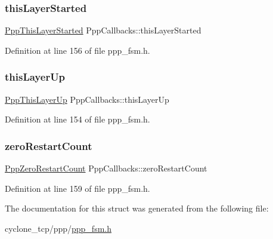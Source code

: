 \mbox{\label{structPppCallbacks_ade673782b1b8570a6edd46cbb5338ae2}} 
\subsubsection{\texorpdfstring{this\+Layer\+Started}{thisLayerStarted}}
{\footnotesize\ttfamily \hyperlink{ppp__fsm_8h_ac7f910cb18b43d86c18b79f95fd302a1}{Ppp\+This\+Layer\+Started} Ppp\+Callbacks\+::this\+Layer\+Started}



Definition at line 156 of file ppp\+\_\+fsm.\+h.

\mbox{\label{structPppCallbacks_ab370c1403e9b8a362747e6ea4e702b2f}} 
\subsubsection{\texorpdfstring{this\+Layer\+Up}{thisLayerUp}}
{\footnotesize\ttfamily \hyperlink{ppp__fsm_8h_af2c33e781717f7eeccba3b5ebac0524c}{Ppp\+This\+Layer\+Up} Ppp\+Callbacks\+::this\+Layer\+Up}



Definition at line 154 of file ppp\+\_\+fsm.\+h.

\mbox{\label{structPppCallbacks_a1a15264a659c18750ed7ca41dc893e04}} 
\subsubsection{\texorpdfstring{zero\+Restart\+Count}{zeroRestartCount}}
{\footnotesize\ttfamily \hyperlink{ppp__fsm_8h_a64f6f78275b72385feff6b734cb3523c}{Ppp\+Zero\+Restart\+Count} Ppp\+Callbacks\+::zero\+Restart\+Count}



Definition at line 159 of file ppp\+\_\+fsm.\+h.



The documentation for this struct was generated from the following file\+:\begin{DoxyCompactItemize}
\item 
cyclone\+\_\+tcp/ppp/\hyperlink{ppp__fsm_8h}{ppp\+\_\+fsm.\+h}\end{DoxyCompactItemize}
